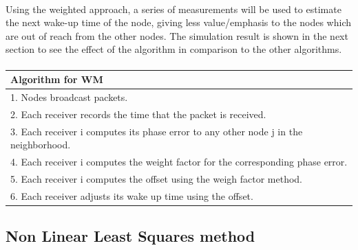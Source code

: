 \documentclass[a4paper,10pt]{report}
\begin{document}
\paragraph*{}
Using the weighted approach, a series of measurements will be used to estimate the next wake-up time of the node, giving less
value/emphasis to the nodes which are out of reach from the other nodes. The simulation result is shown in the next section to see the
effect of the algorithm in comparison to the other algorithms.\paragraph*{}
\begin{tabular}{  l }Algorithm for WM \\\hline \hline
1. Nodes broadcast packets. \\  2. Each receiver records the time that the packet is received. \\
3. Each receiver i computes its phase error to any other node j in the neighborhood. \\
4. Each receiver i computes the weight factor for the corresponding phase error. \\
5. Each receiver i computes the offset using the weigh factor method. \\
6. Each receiver adjusts its wake up time using the offset.\\
\hline \hline
\end{tabular}
\subsection{\textbf{Non Linear Least Squares method}}
\end{document}
